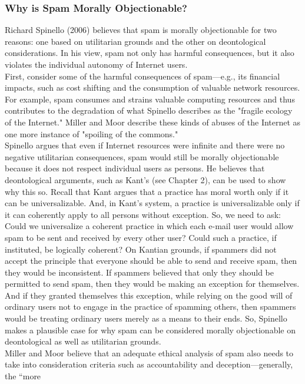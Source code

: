 \documentclass[12pt]{article}
\theoremstyle{definition}
\begin{document}
\subsubsection{Why is Spam Morally Objectionable?}
Richard Spinello (2006) believes that spam is morally objectionable for two reasons: one
based on utilitarian grounds and the other on deontological considerations. In his view,
spam not only has harmful consequences, but it also violates the individual autonomy
of Internet users.\\
First, consider some of the harmful consequences of spam—e.g., its
financial impacts, such as cost shifting and the consumption of valuable network resources. For example, spam consumes and strains valuable computing resources and
thus contributes to the degradation of what Spinello describes as the "fragile ecology of
the Internet." Miller and Moor describe these kinds of abuses of the Internet as one more
instance of "spoiling of the commons."\\
Spinello argues that even if Internet resources were infinite and there were no
negative utilitarian consequences, spam would still be morally objectionable because it
does not respect individual users as persons. He believes that deontological arguments,
such as Kant’s (see Chapter 2), can be used to show why this so. Recall that Kant argues
that a practice has moral worth only if it can be universalizable. And, in Kant’s system, a
practice is universalizable only if it can coherently apply to all persons without exception.
So, we need to ask: Could we universalize a coherent practice in which each e-mail user
would allow spam to be sent and received by every other user? Could such a practice, if
instituted, be logically coherent? On Kantian grounds, if spammers did not accept the
principle that everyone should be able to send and receive spam, then they would be
inconsistent. If spammers believed that only they should be permitted to send spam, then
they would be making an exception for themselves. And if they granted themselves this
exception, while relying on the good will of ordinary users not to engage in the practice of
spamming others, then spammers would be treating ordinary users merely as a means to
their ends. So, Spinello makes a plausible case for why spam can be considered morally
objectionable on deontological as well as utilitarian grounds.\\
Miller and Moor believe that an adequate ethical analysis of spam also needs to take
into consideration criteria such as accountability and deception—generally, the “more
\end{document}
